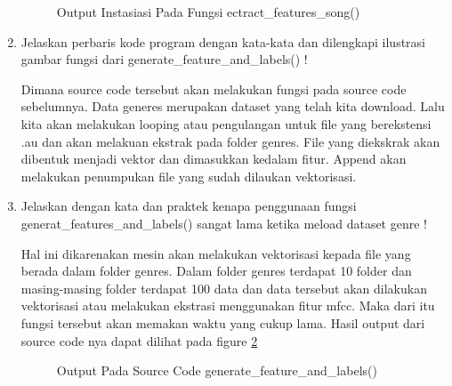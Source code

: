 \begin{enumerate}
	\begin{figure}[!htbp]
		\caption{Output Instasiasi Pada Fungsi ectract\_features\_song()}
		\label{YNC6-10}
	\end{figure}

\item  Jelaskan perbaris kode program dengan kata-kata dan dilengkapi ilustrasi gambar fungsi dari generate\_feature\_and\_labels() !
	
	\subitem Dimana source code tersebut akan melakukan fungsi pada source code sebelumnya. Data generes merupakan dataset yang telah kita download. Lalu kita akan melakukan looping atau pengulangan untuk file yang berekstensi .au dan akan melakuan ekstrak pada folder genres. File yang diekskrak akan dibentuk menjadi vektor dan dimasukkan kedalam fitur. Append akan melakukan penumpukan file yang sudah dilaukan vektorisasi.

\item Jelaskan dengan kata dan praktek kenapa penggunaan fungsi generat\_features\_and\_labels() sangat lama ketika meload dataset genre !
	
	\subitem Hal ini dikarenakan mesin akan melakukan vektorisasi kepada file yang berada dalam folder genres. Dalam folder genres terdapat 10 folder dan masing-masing folder terdapat 100 data dan data tersebut akan dilakukan vektorisasi atau melakukan ekstrasi menggunakan fitur mfcc. Maka dari itu fungsi tersebut akan memakan waktu yang cukup lama. Hasil output dari source code nya dapat dilihat pada figure \ref{YNC6-11}

	\begin{figure}[!htbp]
		\caption{Output Pada Source Code generate\_feature\_and\_labels()}
		\label{YNC6-11}
	\end{figure} 


\end{enumerate}
